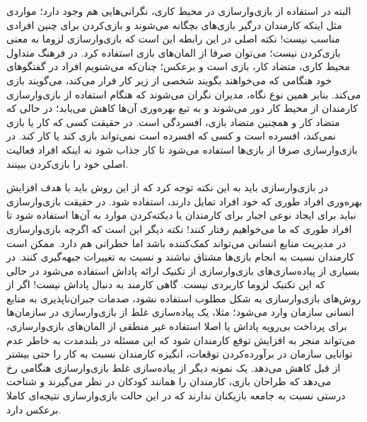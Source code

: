البته در استفاده از بازی‌وارسازی در محیط کاری، نگرانی‌هایی هم وجود دارد؛ مواردی مثل اینکه کارمندان درگیر بازی‌های بچگانه می‌شوند و بازی‌کردن برای چنین افرادی مناسب نیست! نکته اصلی در این رابطه این است که بازی‌وارسازی لزوما به معنی بازی‌کردن نیست؛ می‌توان صرفا از المان‌های بازی استفاده کرد. در فرهنگ متداول محیط کاری، متضاد کار، بازی است و برعکس؛ چنان‌که می‌شنویم افراد در گفتگوهای خود هنگامی که می‌خواهند بگویند شخصی از زیر کار فرار می‌کند، می‌گویند بازی می‌کند. بنابر همین نوع نگاه، مدیران نگران می‌شوند که هنگام استفاده از بازی‌وارسازی کارمندان از محیط کار دور می‌شوند و به تبع بهره‌وری آن‌ها کاهش می‌یابد؛ در حالی که متضاد کار و همچنین متضاد بازی، افسردگی است. در حقیقت کسی که کار یا بازی نمی‌کند، افسرده است و کسی که افسرده است نمی‌تواند بازی کند یا کار کند. در بازی‌وارسازی صرفا از بازی‌ها استفاده می‌شود تا کار جذاب شود نه اینکه افراد فعالیت اصلی خود را بازی‌کردن ببینند.

در بازی‌وارسازی باید به این نکته توجه کرد که از این روش باید با هدف افزایش بهره‌وری افراد طوری که خود افراد تمایل دارند، استفاده شود. در حقیقت بازی‌وارسازی نباید برای ایجاد نوعی اجبار برای کارمندان یا دیکته‌کردن موارد به آن‌ها استفاده شود تا افراد طوری که ما می‌خواهیم رفتار کنند!
نکته دیگر این است که اگرچه بازی‌وارسازی در مدیریت منابع انسانی می‌تواند کمک‌کننده باشد اما خطراتی هم دارد. ممکن است کارمندان نسبت به انجام بازی‌ها مشتاق نباشند و نسبت به تغییرات جبهه‌گیری کنند. در بسیاری از پیاده‌سازی‌های بازی‌وارسازی از تکنیک ارائه پاداش استفاده می‌شود در حالی که این تکنیک لزوما کاربردی نیست. گاهی کارمند به دنبال پاداش نیست! اگر از روش‌های بازی‌وارسازی به شکل مطلوب استفاده نشود، صدمات جبران‌ناپذیری به منابع انسانی سازمان وارد می‌شود؛ مثلا، یک پیاده‌سازی غلط از بازی‌وارسازی در سازمان‌ها برای پرداخت بی‌رویه پاداش یا اصلا استفاده غیر منطقی از المان‌های بازی‌وارسازی، می‌تواند منجر به افزایش توقع کارمندان شود که این مسئله در بلندمدت به خاطر عدم توانایی سازمان در برآورده‌کردن توقعات، انگیزه کارمندان نسبت به کار را حتی بیشتر از قبل کاهش می‌دهد. یک نمونه دیگر از پیاده‌سازی غلط بازی‌وارسازی هنگامی رخ می‌دهد که طراحان بازی، کارمندان را همانند کودکان در نظر می‌گیرند و شناخت درستی نسبت به جامعه بازیکنان ندارند که در این حالت بازی‌وارسازی نتیجه‌ای کاملا برعکس دارد.

